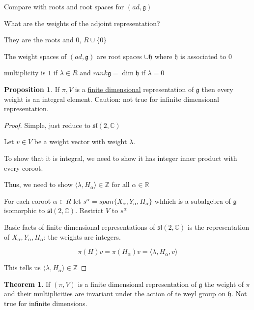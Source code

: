 \documentclass{article}
\theoremstyle{definition}
\newtheorem{theorem}{Theorem}
\newtheorem{proposition}{Proposition}
\begin{document}
Compare with roots and root spaces for \((ad, \mathfrak{g})\) 

What are the weights of the adjoint representation?

They are the roots and 0, \(R \cup \{ 0 \} \) 

The weight spaces of \((ad, \mathfrak{g} )\) are root spaces \(\cup \mathfrak{h}\) where \(\mathfrak{h} \) is associated to \(0\)

multiplicity is \(1\) if \(\lambda\in R\) and \(rank  \mathfrak{g} = \dim \mathfrak{h}\) if \(\lambda =0\) 

\begin{proposition}
    If \(\pi ,V\) is a \underline{finite dimensional} representation of \(\mathfrak{g}\) then every weight is an integral element. Caution: not true for infinite dimensional representation.
\end{proposition}

\begin{proof}
    Simple, just reduce to \(\mathfrak{sl}(2,\mathbb{C})\) 

    Let \(v\in V\) be a weight vector with weight \(\lambda\).
    
    To show that it is integral, we need to show it has integer inner product with every coroot.

    Thus, we need to show \(\langle \lambda ,H_\alpha \rangle \in \mathbb{Z}\) for all \(\alpha \in \mathbb{R}\) 

    For each coroot \(\alpha \in R\) let \(s^\alpha = span\{ X_\alpha , Y_\alpha , H_\alpha \} \) whhich is a subalgebra of \(\mathfrak{g} \) isomorphic to \(\mathfrak{sl} (2,\mathbb{C} )\). Restrict \(V\) to \(s^\alpha\) 

    Basic facts of finite dimensional representations of \(\mathfrak{sl}(2,\mathbb{C} ) \) is the representation of \(X_\alpha ,Y_\alpha ,H_\alpha \): the weights are integers.

    \[
        \pi (H)v = \pi (H_\alpha)v = \langle \lambda , H_\alpha ,v \rangle 
    \]

    This tells us \(\langle \lambda ,H_\alpha \rangle \in \mathbb{Z}\) 


\end{proof}

\begin{theorem}
    If \((\pi ,V)\) is a finite dimensional representation of \(\mathfrak{g} \) the weight of \(\pi \) and their multiplicities are invariant under the action of te weyl group on \(\mathfrak{h}\). Not true for infinite dimensions.
\end{theorem}
\end{document}

